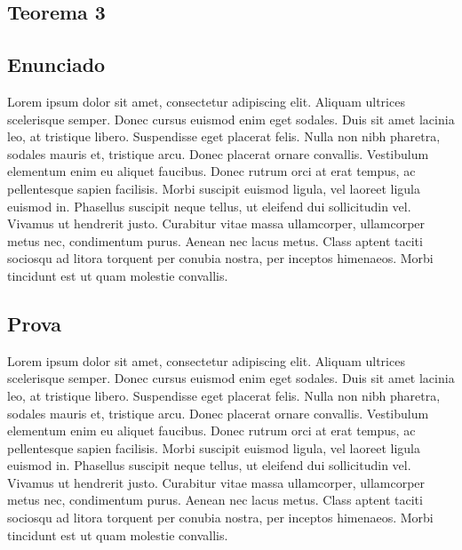 \documentclass[twoside]{article}
\begin{document}
\begin{multicols}{2}
\section{Teorema 3}

\subsection{ Enunciado }
\indent Lorem ipsum dolor sit amet, consectetur adipiscing elit. Aliquam ultrices scelerisque semper. Donec cursus euismod enim eget sodales. Duis sit amet lacinia leo, at tristique libero. Suspendisse eget placerat felis. Nulla non nibh pharetra, sodales mauris et, tristique arcu. Donec placerat ornare convallis. Vestibulum elementum enim eu aliquet faucibus. Donec rutrum orci at erat tempus, ac pellentesque sapien facilisis. Morbi suscipit euismod ligula, vel laoreet ligula euismod in. Phasellus suscipit neque tellus, ut eleifend dui sollicitudin vel. Vivamus ut hendrerit justo. Curabitur vitae massa ullamcorper, ullamcorper metus nec, condimentum purus. Aenean nec lacus metus. Class aptent taciti sociosqu ad litora torquent per conubia nostra, per inceptos himenaeos. Morbi tincidunt est ut quam molestie convallis.



\subsection{ Prova }
\indent Lorem ipsum dolor sit amet, consectetur adipiscing elit. Aliquam ultrices scelerisque semper. Donec cursus euismod enim eget sodales. Duis sit amet lacinia leo, at tristique libero. Suspendisse eget placerat felis. Nulla non nibh pharetra, sodales mauris et, tristique arcu. Donec placerat ornare convallis. Vestibulum elementum enim eu aliquet faucibus. Donec rutrum orci at erat tempus, ac pellentesque sapien facilisis. Morbi suscipit euismod ligula, vel laoreet ligula euismod in. Phasellus suscipit neque tellus, ut eleifend dui sollicitudin vel. Vivamus ut hendrerit justo. Curabitur vitae massa ullamcorper, ullamcorper metus nec, condimentum purus. Aenean nec lacus metus. Class aptent taciti sociosqu ad litora torquent per conubia nostra, per inceptos himenaeos. Morbi tincidunt est ut quam molestie convallis.




\end{multicols}
\end{document}
